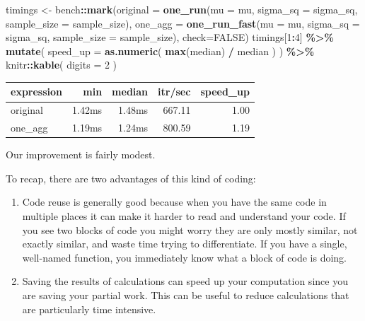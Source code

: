 \documentclass[
]{book}
\newenvironment{Shaded}{\begin{snugshade}}{\end{snugshade}}
\newcommand{\AttributeTok}[1]{\textcolor[rgb]{0.13,0.29,0.53}{#1}}
\newcommand{\ConstantTok}[1]{\textcolor[rgb]{0.56,0.35,0.01}{#1}}
\newcommand{\DecValTok}[1]{\textcolor[rgb]{0.00,0.00,0.81}{#1}}
\newcommand{\FunctionTok}[1]{\textcolor[rgb]{0.13,0.29,0.53}{\textbf{#1}}}
\newcommand{\NormalTok}[1]{#1}
\newcommand{\OtherTok}[1]{\textcolor[rgb]{0.56,0.35,0.01}{#1}}
\newcommand{\SpecialCharTok}[1]{\textcolor[rgb]{0.81,0.36,0.00}{\textbf{#1}}}
\begin{document}
\begin{Shaded}
\begin{Highlighting}[]
\NormalTok{timings }\OtherTok{\textless{}{-}}\NormalTok{ bench}\SpecialCharTok{::}\FunctionTok{mark}\NormalTok{(}\AttributeTok{original =} \FunctionTok{one\_run}\NormalTok{(}\AttributeTok{mu =}\NormalTok{ mu, }\AttributeTok{sigma\_sq =}\NormalTok{ sigma\_sq, }
                                          \AttributeTok{sample\_size =}\NormalTok{ sample\_size),}
                       \AttributeTok{one\_agg =} \FunctionTok{one\_run\_fast}\NormalTok{(}\AttributeTok{mu =}\NormalTok{ mu, }\AttributeTok{sigma\_sq =}\NormalTok{ sigma\_sq, }
                                              \AttributeTok{sample\_size =}\NormalTok{ sample\_size),}
                       \AttributeTok{check=}\ConstantTok{FALSE}\NormalTok{)}
\NormalTok{timings[}\DecValTok{1}\SpecialCharTok{:}\DecValTok{4}\NormalTok{] }\SpecialCharTok{\%\textgreater{}\%}
  \FunctionTok{mutate}\NormalTok{( }\AttributeTok{speed\_up =} \FunctionTok{as.numeric}\NormalTok{( }\FunctionTok{max}\NormalTok{(median) }\SpecialCharTok{/}\NormalTok{ median ) ) }\SpecialCharTok{\%\textgreater{}\%}
\NormalTok{  knitr}\SpecialCharTok{::}\FunctionTok{kable}\NormalTok{( }\AttributeTok{digits =} \DecValTok{2}\NormalTok{ )}
\end{Highlighting}
\end{Shaded}

\begin{tabular}{l|r|r|r|r}
\hline
expression & min & median & itr/sec & speed\_up\\
\hline
original & 1.42ms & 1.48ms & 667.11 & 1.00\\
\hline
one\_agg & 1.19ms & 1.24ms & 800.59 & 1.19\\
\hline
\end{tabular}

Our improvement is fairly modest.

To recap, there are two advantages of this kind of coding:

\begin{enumerate}
\def\labelenumi{\arabic{enumi}.}
\item
  Code reuse is generally good because when you have the same code in multiple places it can make it harder to read and understand your code. If you see two blocks of code you might worry they are only mostly similar, not exactly similar, and waste time trying to differentiate. If you have a single, well-named function, you immediately know what a block of code is doing.
\item
  Saving the results of calculations can speed up your computation since you are saving your partial work. This can be useful to reduce calculations that are particularly time intensive.
\end{enumerate}
\end{document}
